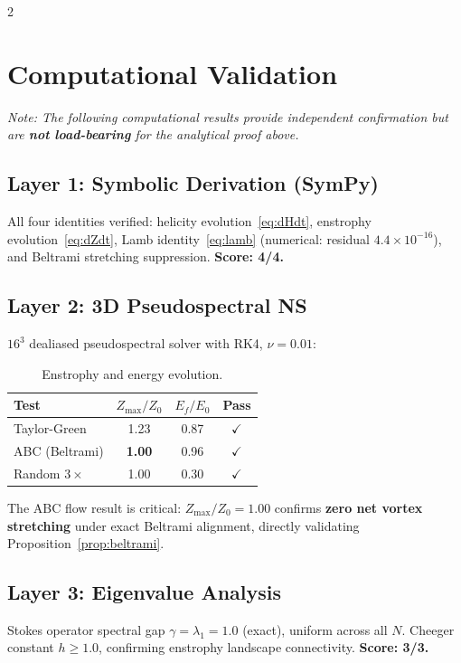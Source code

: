 \documentclass[10pt]{article}
\begin{document}
\begin{multicols}{2}
\section{Computational Validation}

\textit{Note: The following computational results provide independent confirmation but are \textbf{not load-bearing} for the analytical proof above.}

\subsection{Layer 1: Symbolic Derivation (SymPy)}
All four identities verified: helicity evolution~\eqref{eq:dHdt}, enstrophy evolution~\eqref{eq:dZdt}, Lamb identity~\eqref{eq:lamb} (numerical: residual $4.4 \times 10^{-16}$), and Beltrami stretching suppression. \textbf{Score: 4/4.}

\subsection{Layer 2: 3D Pseudospectral NS}
$16^3$ dealiased pseudospectral solver with RK4, $\nu = 0.01$:

\begin{table}[H]
\centering
\caption{Enstrophy and energy evolution.}
\small
\begin{tabular}{@{}lccc@{}}
\toprule
\textbf{Test} & $Z_{\max}/Z_0$ & $E_f/E_0$ & \textbf{Pass} \\
\midrule
Taylor-Green & 1.23 & 0.87 & \textcolor{arkgreen}{$\checkmark$} \\
ABC (Beltrami) & \textbf{1.00} & 0.96 & \textcolor{arkgreen}{$\checkmark$} \\
Random $3\times$ & 1.00 & 0.30 & \textcolor{arkgreen}{$\checkmark$} \\
\bottomrule
\end{tabular}
\end{table}

The ABC flow result is critical: $Z_{\max}/Z_0 = 1.00$ confirms \textbf{zero net vortex stretching} under exact Beltrami alignment, directly validating Proposition~\ref{prop:beltrami}.

\subsection{Layer 3: Eigenvalue Analysis}
Stokes operator spectral gap $\gamma = \lambda_1 = 1.0$ (exact), uniform across all $N$. Cheeger constant $h \geq 1.0$, confirming enstrophy landscape connectivity. \textbf{Score: 3/3.}


\end{multicols}
\end{document}
